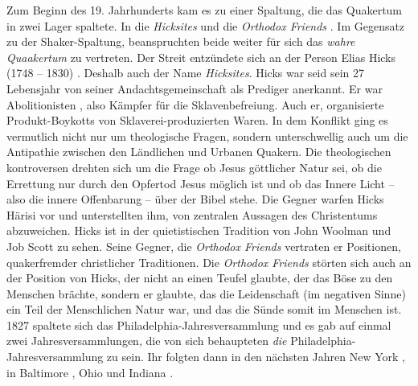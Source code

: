 Zum Beginn des 19. Jahrhunderts kam es zu einer Spaltung, die das Quakertum in
zwei Lager spaltete. In die \textit{Hicksites}  und die \textit{Orthodox
Friends} . Im Gegensatz zu der Shaker-Spaltung, beanspruchten beide weiter für
sich das \textit{wahre Quaakertum} zu vertreten. Der Streit entzündete sich an
der Person Elias Hicks (1748 -- 1830) . Deshalb auch der Name \textit{Hicksites}.
Hicks war seid sein 27 Lebensjahr von seiner Andachtsgemeinschaft als Prediger
anerkannt. Er war Abolitionisten , also Kämpfer für die Sklavenbefreiung. Auch
er, organisierte Produkt-Boykotts von Sklaverei-produzierten Waren. In dem
Konflikt ging es vermutlich nicht nur um theologische Fragen, sondern
unterschwellig auch um die Antipathie zwischen den Ländlichen und Urbanen
Quakern. Die theologischen kontroversen drehten sich um die Frage ob Jesus
göttlicher Natur sei, ob die Errettung nur durch den Opfertod Jesus möglich ist
und ob das Innere Licht  -- also die innere Offenbarung -- über der Bibel  stehe.
Die Gegner warfen Hicks Härisi vor und unterstellten ihm, von zentralen
Aussagen des Christentums abzuweichen. Hicks ist in der quietistischen Tradition
von John Woolman  und Job Scott  zu sehen. Seine Gegner, die \textit{Orthodox
Friends}  vertraten er Positionen, quakerfremder christlicher Traditionen. Die
\textit{Orthodox Friends} störten sich auch an der Position von Hicks, der nicht
an einen Teufel  glaubte, der das Böse zu den Menschen brächte, sondern er
glaubte, das die Leidenschaft (im negativen Sinne) ein Teil der Menschlichen
Natur war, und das die Sünde  somit im Menschen ist. 1827 spaltete sich das
Philadelphia-Jahresversammlung und es gab auf einmal zwei Jahresversammlungen,
die von sich behaupteten \textit{die} Philadelphia-Jahresversammlung zu sein.
Ihr folgten dann in den nächsten Jahren New York , in Baltimore , Ohio  und
Indiana .

\medskip

